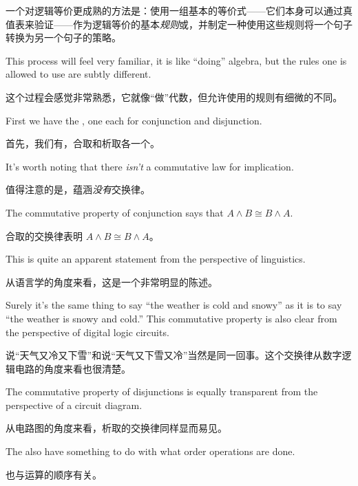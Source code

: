 一个对逻辑等价更成熟的方法是：使用一组基本的等价式——它们本身可以通过真值表来验证——作为逻辑等价的基本{\em 规则}或，并制定一种使用这些规则将一个句子转换为另一个句子的策略。

This process will feel very
familiar, it is like ``doing'' algebra, but the rules one is allowed 
to use are subtly different.

这个过程会感觉非常熟悉，它就像“做”代数，但允许使用的规则有细微的不同。

First we have the , 
one each for conjunction
and disjunction.

首先，我们有，合取和析取各一个。

It's worth noting that there {\em isn't} a commutative
law for implication.

值得注意的是，蕴涵{\em 没有}交换律。

The commutative property of conjunction says that $A \land B \cong B \land A$.

合取的交换律表明 $A \land B \cong B \land A$。

This is quite an apparent statement from the perspective of linguistics.

从语言学的角度来看，这是一个非常明显的陈述。

Surely it's the same thing to say ``the weather is cold and snowy'' as it is to
say ``the weather is snowy and cold.''   
This commutative property is also clear 
from the perspective of digital logic circuits.

说“天气又冷又下雪”和说“天气又下雪又冷”当然是同一回事。这个交换律从数字逻辑电路的角度来看也很清楚。

\begin{center}

\end{center}   
  
The commutative property of disjunctions is equally transparent from
the perspective of a circuit diagram.

从电路图的角度来看，析取的交换律同样显而易见。

\begin{center}

\end{center}   
  
The  also have something to do with what order operations
are done.

也与运算的顺序有关。

